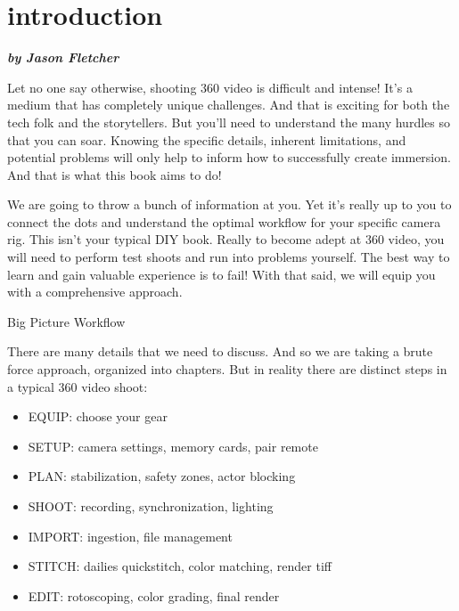 
\SkipTocEntry\section*{introduction}
\addtocounter{section}{2}
\begin{fullwidth}

{\itshape\bfseries by Jason Fletcher

}

Let no one say otherwise, shooting 360 video is difficult and intense! It’s a medium that has completely unique challenges. And that is exciting for both the tech folk and the storytellers. But you’ll need to understand the many hurdles so that you can soar. Knowing the specific details, inherent limitations, and potential problems will only help to inform how to successfully create immersion. And that is what this book aims to do!

We are going to throw a bunch of information at you. Yet it's really up to you to connect the dots and understand the optimal workflow for your specific camera rig. This isn’t your typical DIY book. Really to become adept at 360 video, you will need to perform test shoots and run into problems yourself. The best way to learn and gain valuable experience is to fail! With that said, we will equip you with a comprehensive approach.

{\large Big Picture Workflow\par}

There are many details that we need to discuss. And so we are taking a brute force approach, organized into chapters. But in reality there are distinct steps in a typical 360 video shoot:

\begin{itemize}
\item EQUIP: choose your gear
\item SETUP: camera settings, memory cards, pair remote
\item PLAN: stabilization, safety zones, actor blocking
\item SHOOT: recording, synchronization, lighting
\item IMPORT: ingestion, file management 
\item STITCH: dailies quickstitch, color matching, render tiff
\item EDIT: rotoscoping, color grading, final render
\end{itemize}

\clearpage
\end{fullwidth}
